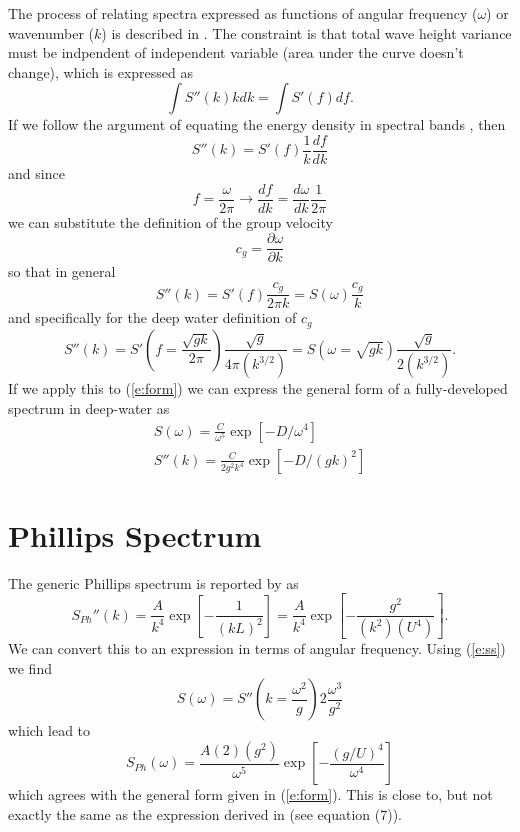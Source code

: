 \documentclass[11pt]{article}
\begin{document}
The process of relating spectra expressed as functions of angular frequency ($\omega$) or wavenumber ($k$) is described in \cite{plant09ocean}.  The constraint is that total wave height variance must be indpendent of independent variable (area under the curve doesn't change), which is expressed as
\begin{equation}
\int S''(k) k dk = \int S'(f) df.
\end{equation}
If we follow the argument of equating the energy density in spectral bands \cite{}, then
\begin{equation} S''(k) = S'(f) \frac{1}{k} \frac{df}{dk}\end{equation}
and since
\begin{equation} f = \frac{\omega}{2 \pi} \rightarrow \frac{df}{dk}=\frac{d\omega}{dk}\frac{1}{2 \pi} \end{equation}
we can substitute the definition of the group velocity
\begin{equation} c_g = \frac{\partial \omega}{\partial k} \end{equation}
so that in general
\begin{equation} S''(k) = S'(f) \frac{c_g}{2 \pi k} = S(\omega) \frac{c_g}{k}\end{equation}
and specifically for the deep water definition of $c_g$
\begin{equation} S''(k) = 
S'\left(f=\frac{\sqrt{gk}}{2\pi}\right) \frac{\sqrt{g}}{4 \pi \left(k^{3/2}\right)} = 
S\left(\omega=\sqrt{gk}\right)\frac{\sqrt{g}}{2 \left(k^{3/2}\right)}.
\label{e:ss}
\end{equation}
If we apply this to (\ref{e:form}) we can express the general form of a fully-developed spectrum in deep-water as
\begin{eqnarray}
S(\omega) = \frac{C}{\omega^5} \exp{\left[ -D/\omega^4 \right]} \\
S''(k) = \frac{C}{2 g^2 k^4} \exp{\left[-D/(gk)^2\right]}
\end{eqnarray}

\section{Phillips Spectrum}
The generic Phillips spectrum is reported by \cite{tessendorf99simulating} as 
\begin{equation} S_{Ph}''(k)= \frac{A}{k^4} \exp{\left[ - \frac{1}{(kL)^2} \right]} 
= \frac{A}{k^4} \exp{\left[ - \frac{g^2}{(k^2)(U^4)} \right]} .
\end{equation}
We can convert this to an expression in terms of angular frequency. Using (\ref{e:ss}) we find
\begin{equation}
S(\omega) = S''\left(k=\frac{\omega^2}{g}\right) 2 \frac{\omega^3}{g^2}
\end{equation}
which lead to
\begin{equation}
S_{Ph}(\omega) = \frac{A(2)(g^2)}{\omega^5} \exp{\left[ - \frac{ (g/U)^4 }{\omega^4} \right]}
\end{equation}
which agrees with the general form given in (\ref{e:form}). This is close to, but not exactly the same as the expression derived in \cite{chen2013onthe} (see equation (7)).
\end{document}
